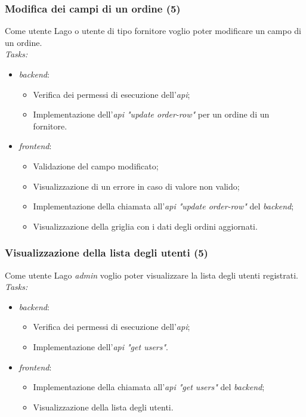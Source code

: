 \subsubsection{Modifica dei campi di un ordine (5)}
Come utente Lago o utente di tipo fornitore voglio poter modificare un campo di un ordine. \\
\emph{Tasks:}
\begin{itemize}
  \item \emph{\gls{backend}}:
    \begin{itemize}
      \item Verifica dei permessi di esecuzione dell'\emph{\acrshort{api}};
      \item Implementazione dell'\emph{\acrshort{api} "update order-row"} per un ordine di un fornitore.
    \end{itemize}
  \item \emph{\gls{frontend}}:
    \begin{itemize}
      \item Validazione del campo modificato;
      \item Visualizzazione di un errore in caso di valore non valido;
      \item Implementazione della chiamata all'\emph{\acrshort{api} "update order-row"} del \emph{\gls{backend}};
      \item Visualizzazione della griglia con i dati degli ordini aggiornati.
    \end{itemize}
\end{itemize}

\subsubsection{Visualizzazione della lista degli utenti (5)}
Come utente Lago \emph{admin} voglio poter visualizzare la lista degli utenti registrati. \\
\emph{Tasks:}
\begin{itemize}
  \item \emph{\gls{backend}}:
    \begin{itemize}
      \item Verifica dei permessi di esecuzione dell'\emph{\acrshort{api}};
      \item Implementazione dell'\emph{\acrshort{api} "get users"}.
    \end{itemize}
  \item \emph{\gls{frontend}}:
    \begin{itemize}
      \item Implementazione della chiamata all'\emph{\acrshort{api} "get users"} del \emph{\gls{backend}};
      \item Visualizzazione della lista degli utenti.
    \end{itemize}
\end{itemize}

